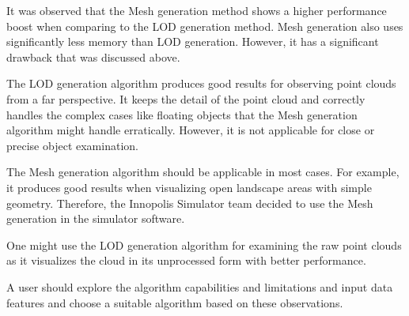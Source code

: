 It was observed that the Mesh generation method shows a higher performance boost when comparing to the LOD generation method. Mesh generation also uses significantly less memory than LOD generation. However, it has a significant drawback that was discussed above.

The LOD generation algorithm produces good results for observing point clouds from a far perspective. It keeps the detail of the point cloud and correctly handles the complex cases like floating objects that the Mesh generation algorithm might handle erratically. However, it is not applicable for close or precise object examination.

The Mesh generation algorithm should be applicable in most cases. For example, it produces good results when visualizing open landscape areas with simple geometry. Therefore, the Innopolis Simulator team decided to use the Mesh generation in the simulator software.

One might use the LOD generation algorithm for examining the raw point clouds as it visualizes the cloud in its unprocessed form with better performance.

A user should explore the algorithm capabilities and limitations and input data features and choose a suitable algorithm based on these observations.
